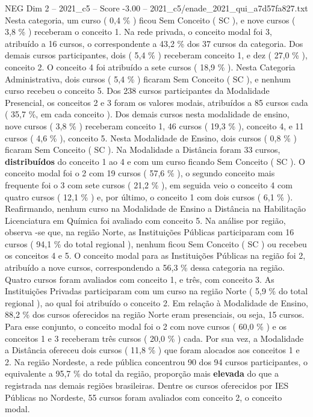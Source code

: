 \begin{textsample}{NEG Dim 2 – 2021\_c5 – Score -3.00 – 2021\_c5/enade\_2021\_qui\_a7d57fa827.txt}
Nesta categoria, um curso ( 0,4 \% ) ficou Sem Conceito ( SC ), e nove cursos ( 3,8 \% ) receberam o conceito 1.
Na rede privada, o conceito modal foi 3, atribuído a 16 cursos, o correspondente a 43,2 \% dos 37 cursos da categoria.
Dos demais cursos participantes, dois ( 5,4 \% ) receberam conceito 1, e dez ( 27,0 \% ), conceito 2.
O conceito 4 foi atribuído a sete cursos ( 18,9 \% ).
Nesta Categoria Administrativa, dois cursos ( 5,4 \% ) ficaram Sem Conceito ( SC ), e nenhum curso recebeu o conceito 5.
Dos 238 cursos participantes da Modalidade Presencial, os conceitos 2 e 3 foram os valores modais, atribuídos a 85 cursos cada ( 35,7 \%, em cada conceito ).
Dos demais cursos nesta modalidade de ensino, nove cursos ( 3,8 \% ) receberam conceito 1, 46 cursos ( 19,3 \% ), conceito 4, e 11 cursos ( 4,6 \% ), conceito 5.
Nesta Modalidade de Ensino, dois cursos ( 0,8 \% ) ficaram Sem Conceito ( SC ).
Na Modalidade a Distância foram 33 cursos, \textbf{distribuídos} do conceito 1 ao 4 e com um curso ficando Sem Conceito ( SC ).
O conceito modal foi o 2 com 19 cursos ( 57,6 \% ), o segundo conceito mais frequente foi o 3 com sete cursos ( 21,2 \% ), em seguida veio o conceito 4 com quatro cursos ( 12,1 \% ) e, por último, o conceito 1 com dois cursos ( 6,1 \% ).
Reafirmando, nenhum curso na Modalidade de Ensino a Distância na Habilitação Licenciatura em Química foi avaliado com conceito 5.
Na análise por região, observa -se que, na região Norte, as Instituições Públicas participaram com 16 cursos ( 94,1 \% do total regional ), nenhum ficou Sem Conceito ( SC ) ou recebeu os conceitos 4 e 5.
O conceito modal para as Instituições Públicas na região foi 2, atribuído a nove cursos, correspondendo a 56,3 \% dessa categoria na região.
Quatro cursos foram avaliados com conceito 1, e três, com conceito 3.
As Instituições Privadas participaram com um curso na região Norte ( 5,9 \% do total regional ), ao qual foi atribuído o conceito 2.
Em relação à Modalidade de Ensino, 88,2 \% dos cursos oferecidos na região Norte eram presenciais, ou seja, 15 cursos.
Para esse conjunto, o conceito modal foi o 2 com nove cursos ( 60,0 \% ) e os conceitos 1 e 3 receberam três cursos ( 20,0 \% ) cada.
Por sua vez, a Modalidade a Distância ofereceu dois cursos ( 11,8 \% ) que foram alocados aos conceitos 1 e 2.
Na região Nordeste, a rede pública concentrou 90 dos 94 cursos participantes, o equivalente a 95,7 \% do total da região, proporção mais \textbf{elevada} do que a registrada nas demais regiões brasileiras.
Dentre os cursos oferecidos por IES Públicas no Nordeste, 55 cursos foram avaliados com conceito 2, o conceito modal.

\end{textsample}
